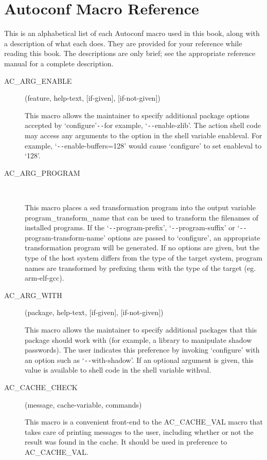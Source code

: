\chapter{Autoconf Macro Reference}

This is an alphabetical list of each Autoconf macro used in this book, along with a description of what each does. They are provided for your reference while reading this book. The descriptions are only brief; see the appropriate reference manual for a complete description. 


\begin{description}
\item[AC\_{}ARG\_{}ENABLE](feature, help-text, [if-given], [if-not-given])

    This macro allows the maintainer to specify additional package options accepted by `configure'\verb+--+for example, `\verb+--+enable-zlib'. The action shell code may access any arguments to the option in the shell variable enableval. For example, `\verb+--+enable-buffers=128' would cause `configure' to set enableval to `128'.

\item[AC\_{}ARG\_{}PROGRAM]
\

    This macro places a sed transformation program into the output variable program\_{}transform\_{}name that can be used to transform the filenames of installed programs. If the `\verb+--+program-prefix', `\verb+--+program-suffix' or
    `\verb+--+program-transform-name' options are passed to `configure', an appropriate transformation program will be generated. If no options are given, but the type of the host system differs from the type of the target system, program names are transformed by prefixing them with the type of the target (eg. arm-elf-gcc).

\item[AC\_{}ARG\_{}WITH](package, help-text, [if-given], [if-not-given])

    This macro allows the maintainer to specify additional packages that this package should work with (for example, a library to manipulate shadow passwords). The user indicates this preference by invoking `configure' with an option such as `\verb+--+with-shadow'. If an optional argument is given, this value is available to shell code in the shell variable withval.

\item[AC\_{}CACHE\_{}CHECK](message, cache-variable, commands)

    This macro is a convenient front-end to the AC\_{}CACHE\_{}VAL macro that takes care of printing messages to the user, including whether or not the result was found in the cache. It should be used in preference to AC\_{}CACHE\_{}VAL.


\end{description}
